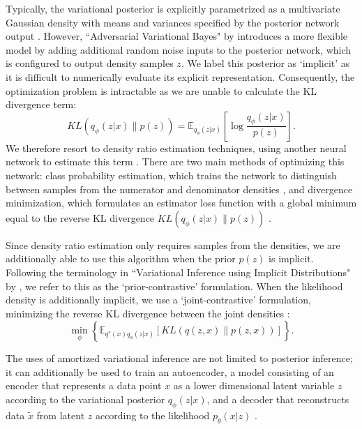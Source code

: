 \documentclass[honours,12pt, twoside]{unswthesis}
\newcommand{\E}{\mathbb{E}}
\numberwithin{equation}{section}
\theoremstyle{definition}
\begin{document}
Typically, the variational posterior is explicitly parametrized as a multivariate Gaussian density with means and variances specified by the posterior network output \citep{kingma}. However, ``Adversarial Variational Bayes" by \citet{mescheder} introduces a more flexible model by adding additional random noise inputs to the posterior network, which is configured to output density samples $z$. We label this posterior as `implicit' as it is difficult to numerically evaluate its explicit representation. Consequently, the optimization problem is intractable as we are unable to calculate the KL divergence term:\[KL(q_\phi(z|x)\|p(z))=\E_{q_\phi(z|x)}\left[\log \frac{q_\phi(z|x)}{p(z)}\right].\] We therefore resort to density ratio estimation techniques, using another neural network to estimate this term \citep{sugiyama, mohamed}. There are two main methods of optimizing this network: class probability estimation, which trains the network to distinguish between samples from the numerator and denominator densities \citep{gan}, and divergence minimization, which formulates an estimator loss function with a global minimum equal to the reverse KL divergence $KL(q_\phi(z|x)\|p(z))$ \citep{nguyen}.

Since density ratio estimation only requires samples from the densities, we are additionally able to use this algorithm when the prior $p(z)$ is implicit. Following the terminology in ``Variational Inference using Implicit Distributions" by \citet{huszar}, we refer to this as the `prior-contrastive' formulation. When the likelihood density is additionally implicit, we use a `joint-contrastive' formulation, minimizing the reverse KL divergence between the joint densities \citep{tran}:
\[\min_\phi \left\lbrace\E_{q^*(x)q_\phi(z|x)}\left[KL(q(z,x)\|p(z,x))\right]\right\rbrace.\]

The uses of amortized variational inference are not limited to posterior inference; it can additionally be used to train an autoencoder, a model consisting of an encoder that represents a data point $x$ as a lower dimensional latent variable $z$ according to the variational posterior $q_\phi(z|x)$, and a decoder that reconstructs data $\tilde{x}$ from latent $z$ according to the likelihood $p_\theta(x|z)$ \citep{kingma}.
\end{document}
